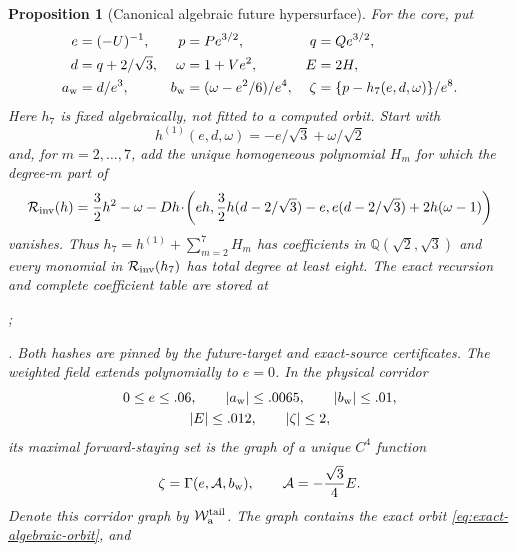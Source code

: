 \documentclass[11pt]{amsart}
\numberwithin{equation}{section}
\newtheorem{proposition}[theorem]{Proposition}
\theoremstyle{definition}
\theoremstyle{remark}
\newcommand{\cA}{\mathcal A}
\begin{document}
\begin{proposition}[Canonical algebraic future hypersurface]
\label{prop:core-algebraic-future}
For the core, put
\begin{equation}\label{eq:validated-weighted-coordinates}
 \begin{aligned}
 e&=(-U)^{-1}, & p&=Pe^{3/2}, & q&=Qe^{3/2},\\
 d&=q+2/\sqrt3, & \omega&=1+Ve^2, & E&=2H,\\
 a_{\rm w}&=d/e^3, &
 b_{\rm w}&=(\omega-e^2/6)/e^4,
 & \zeta&=\{p-h_7(e,d,\omega)\}/e^8.
 \end{aligned}
\end{equation}
Here $h_7$ is fixed algebraically, not fitted to a computed orbit.  Start
with
\[
 h^{(1)}(e,d,\omega)=-e/\sqrt3+\omega/\sqrt2
\]
and, for $m=2,\ldots,7$, add the unique homogeneous polynomial $H_m$ for
which the degree-$m$ part of
\begin{equation}\label{eq:h7-invariance-defect}
 \mathcal R_{\rm inv}(h)=\frac32h^2-\omega
 -Dh\!\cdot\!\left(eh,\frac32h(d-2/\sqrt3)-e,
       e(d-2/\sqrt3)+2h(\omega-1)\right)
\end{equation}
vanishes.  Thus $h_7=h^{(1)}+\sum_{m=2}^7H_m$ has coefficients in
$\mathbb Q(\sqrt2,\sqrt3)$ and every monomial in
$\mathcal R_{\rm inv}(h_7)$ has
total degree at least eight.  The exact recursion and complete coefficient
table are stored at
\begingroup\small
\par\noindent
{};\par\noindent
{}.
\endgroup
Both hashes are pinned by the future-target and exact-source certificates.
The weighted field extends polynomially to $e=0$.  In the physical
corridor
\begin{equation}\label{eq:validated-algebraic-corridor}
 \begin{gathered}
 0\le e\le.06,\qquad |a_{\rm w}|\le.0065,
 \qquad |b_{\rm w}|\le.01,\\
 |E|\le.012,\qquad |\zeta|\le2,
 \end{gathered}
\end{equation}
its maximal forward-staying set is the graph of a unique $C^4$ function
\begin{equation}\label{eq:validated-algebraic-graph}
 \zeta=\Gamma(e,\cA,b_{\rm w}),\qquad
 \cA=-\frac{\sqrt3}{4}E.
\end{equation}
Denote this corridor graph by $\mathcal W_{\rm a}^{\rm tail}$.
The graph contains the exact orbit \eqref{eq:exact-algebraic-orbit}, and

\end{proposition}
\end{document}
